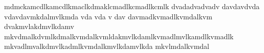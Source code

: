 mdmckamcdlkamcdlkmaclkdmaklcmadlkcmadlkcmlk dvadadvadvadv davdavdvda vdavdavmkdalmvlkmda vda vda v dav davmadkvmadlkvmdalkvm dvakmvlakdmvlkdamv mkvdmalkdvmlkdmalkvmdalkvmldakmvlkdamlkvmadlmvlkamdlkvmadlk mkvadlmvalkdmvlkadmlkvmdalkmvlkdamvlkda mkvlmdalkvmdal
